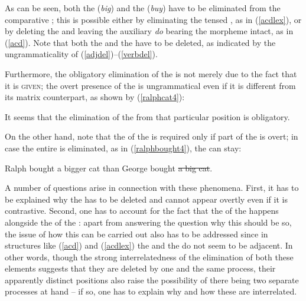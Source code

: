 As can be seen, both the  (\textit{big}) and the  (\textit{buy}) have to be eliminated from the comparative ; this is possible either by eliminating the tensed , as in (\ref{acdlex}), or by deleting the  and leaving the auxiliary \textit{do} bearing the  morpheme intact, as in (\ref{acd}). Note that both the  and the  have to be deleted, as indicated by the ungrammaticality of (\ref{adjdel})--(\ref{verbdel}).

Furthermore, the obligatory elimination of the  is not merely due to the fact that it is \textsc{given}; the overt presence of the  is ungrammatical even if it is different from its matrix  counterpart, as shown by (\ref{ralphcat4}):

\ea \label{ralphcat4}
\z
\z

It seems that the elimination of the  from that particular position is obligatory.

On the other hand, note that the  of the  is required only if part of the  is overt; in case the entire  is eliminated, as in (\ref{ralphbought4}), the  can stay:

\ea Ralph bought a bigger cat than George bought \sout{a big cat}. \label{ralphbought4}
\z

A number of questions arise in connection with these phenomena. First, it has to be explained why the  has to be deleted and cannot appear overtly even if it is contrastive. Second, one has to account for the fact that the  of the  happens alongside the  of the : apart from answering the question why this should be so, the issue of how this can be carried out also has to be addressed since in structures like (\ref{acd}) and (\ref{acdlex}) the  and the  do not seem to be adjacent. In other words, though the strong interrelatedness of the elimination of both these elements suggests that they are deleted by one and the same process, their apparently distinct positions also raise the possibility of there being two separate processes at hand -- if so, one has to explain why and how these are interrelated.


